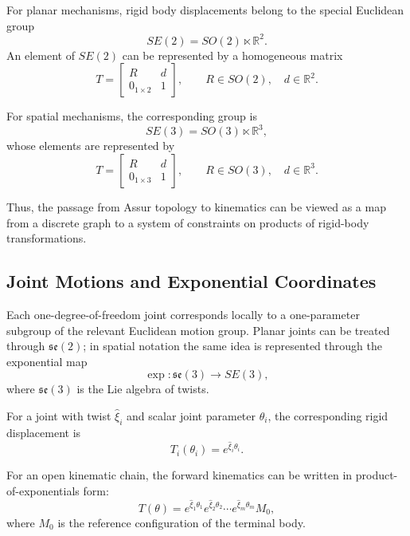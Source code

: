 \documentclass[12pt,a4paper]{article}
\begin{document}
For planar mechanisms, rigid body displacements belong to the special Euclidean group
\[
SE(2) = SO(2) \ltimes \mathbb{R}^2.
\]
An element of $SE(2)$ can be represented by a homogeneous matrix
\begin{equation}
T =
\begin{bmatrix}
R & d \\
0_{1\times 2} & 1
\end{bmatrix},
\qquad
R \in SO(2), \quad d \in \mathbb{R}^2.
\end{equation}

For spatial mechanisms, the corresponding group is
\[
SE(3) = SO(3) \ltimes \mathbb{R}^3,
\]
whose elements are represented by
\begin{equation}
T =
\begin{bmatrix}
R & d \\
0_{1\times 3} & 1
\end{bmatrix},
\qquad
R \in SO(3), \quad d \in \mathbb{R}^3.
\end{equation}

Thus, the passage from Assur topology to kinematics can be viewed as a map from a discrete graph to a system of constraints on products of rigid-body transformations.

\subsection{Joint Motions and Exponential Coordinates}

Each one-degree-of-freedom joint corresponds locally to a one-parameter subgroup of the relevant Euclidean motion group. Planar joints can be treated through $\mathfrak{se}(2)$; in spatial notation the same idea is represented through the exponential map
\[
\exp : \mathfrak{se}(3) \to SE(3),
\]
where $\mathfrak{se}(3)$ is the Lie algebra of twists.

For a joint with twist $\hat{\xi}_i$ and scalar joint parameter $\theta_i$, the corresponding rigid displacement is
\begin{equation}
T_i(\theta_i) = e^{\hat{\xi}_i \theta_i}.
\end{equation}

For an open kinematic chain, the forward kinematics can be written in product-of-exponentials form:
\begin{equation}
T(\theta)
=
e^{\hat{\xi}_1 \theta_1}
e^{\hat{\xi}_2 \theta_2}
\cdots
e^{\hat{\xi}_m \theta_m}
M_0,
\end{equation}
where $M_0$ is the reference configuration of the terminal body.
\end{document}
